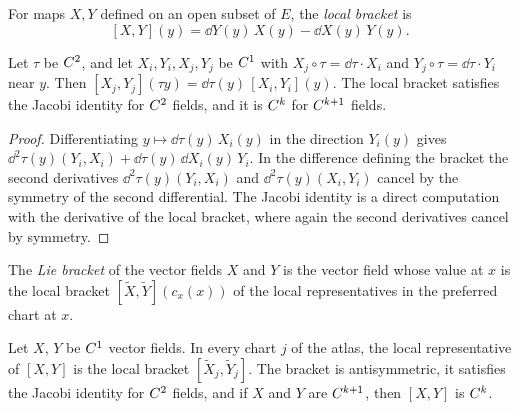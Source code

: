 For maps $X, Y$ defined on an open subset of $E$, the \emph{local bracket} is
\[
  [X, Y](y) = \dd Y(y)\,X(y) - \dd X(y)\,Y(y).
\]

\begin{lemma}
  \label{lem:man-local-bracket}
  \leanok
  Let $\tau$ be $C^{2}$, and let $X_i, Y_i, X_j, Y_j$ be $C^{1}$ with
  $X_j \circ \tau = \dd\tau \cdot X_i$ and $Y_j \circ \tau = \dd\tau \cdot Y_i$ near $y$. Then
  $[X_j, Y_j](\tau y) = \dd\tau(y)\,[X_i, Y_i](y)$. The local bracket satisfies the Jacobi identity
  for $C^{2}$ fields, and it is $C^{k}$ for $C^{k+1}$ fields.
\end{lemma}

\begin{proof}
  \leanok
  Differentiating $y \mapsto \dd\tau(y)\,X_i(y)$ in the direction $Y_i(y)$ gives
  $\dd^2\tau(y)(Y_i, X_i) + \dd\tau(y)\,\dd X_i(y)\,Y_i$. In the difference defining the bracket
  the second derivatives $\dd^2\tau(y)(Y_i, X_i)$ and $\dd^2\tau(y)(X_i, Y_i)$ cancel by the
  symmetry of the second differential. The Jacobi identity is a direct computation with the
  derivative of the local bracket, where again the second derivatives cancel by symmetry.
\end{proof}

\begin{definition}
  \label{def:man-lie-bracket}
  \leanok
  The \emph{Lie bracket} of the vector fields $X$ and $Y$ is the vector field whose value at $x$
  is the local bracket $[\widetilde{X}, \widetilde{Y}](c_x(x))$ of the local representatives in
  the preferred chart at $x$.
\end{definition}

\begin{theorem}
  \label{thm:man-lie-bracket}
  \leanok
  Let $X$, $Y$ be $C^{1}$ vector fields. In every chart $j$ of the atlas, the local
  representative of $[X, Y]$ is the local bracket $[\widetilde{X}_j, \widetilde{Y}_j]$. The
  bracket is antisymmetric, it satisfies the Jacobi identity for $C^{2}$ fields, and if $X$ and
  $Y$ are $C^{k+1}$, then $[X, Y]$ is $C^{k}$.
\end{theorem}

